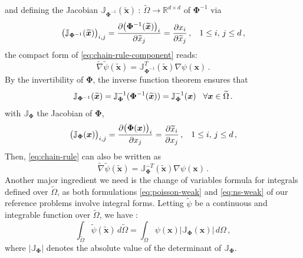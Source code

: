 \documentclass[12pt, a4paper, twoside, openright, notitlepage]{report}
\numberwithin{equation}{chapter}
\theoremstyle{theorem}
\theoremstyle{definition}
\theoremstyle{remark}
\theoremstyle{proposition}
\numberwithin{figure}{chapter}
\newcommand{\wt}[1]{\widetilde{#1}}
\newcommand{\bg}[1]{\boldsymbol{#1}}
\begin{document}
		and defining the Jacobian $\mathbb{J}_{\bg{\Phi}^{-1}}(\wt{\bg{x}}) ~ : ~ \wt{\Omega} \rightarrow \mathbb{R}^{d \times d}$ of $\bg{\Phi}^{-1}$ via
		\begin{equation*}
			\big( \mathbb{J}_{\bg{\Phi}^{-1}}(\wt{\bg{x}}) \big)_{i,j} = \dfrac{\partial \big( \bg{\Phi}^{-1}(\wt{\bg{x}}) \big)_i}{\partial \wt{x}_j} = \dfrac{\partial x_i}{\partial \wt{x}_j} \, , \hspace*{0.3cm} 1 \leq i, \, j \leq d \, ,
		\end{equation*} 
		the compact form of \eqref{eq:chain-rule-component} reads:
		\begin{equation}
			\label{eq:chain-rule}
			\wt{\nabla}{\wt{\psi}}(\wt{\bg{x}}) = \mathbb{J}_{\bg{\Phi}^{-1}}^T (\wt{\bg{x}}) \nabla{\psi}(\bg{x}) \, .
		\end{equation}  
		By the invertibility of $\bg{\Phi}$, the inverse function theorem \cite{Rud64} ensures that
		\begin{equation*}
			\mathbb{J}_{\bg{\Phi}^{-1}} (\wt{\bg{x}}) = \mathbb{J}^{-1}_{\bg{\Phi}} (\bg{\Phi}^{-1}(\wt{\bg{x}})) = \mathbb{J}^{-1}_{\bg{\Phi}} (\bg{x}) \hspace*{0.3cm} \forall \bg{x} \in \wt{\Omega} \, .
		\end{equation*}
		with $\mathbb{J}_{\bg{\Phi}}$ the Jacobian of $\bg{\Phi}$,
		\begin{equation*}
			\big( \mathbb{J}_{\bg{\Phi}}(\bg{x}) \big)_{i,j} = \dfrac{\partial \big( \bg{\Phi}(\bg{x}) \big)_i}{\partial x_j} = \dfrac{\partial \wt{x}_i}{\partial x_j} \, , \hspace*{0.3cm} 1 \leq i, \, j \leq d \, ,
		\end{equation*}
		Then, \eqref{eq:chain-rule} can also be written as
		\begin{equation}
			\label{eq:chain-rule-bis}
			\wt{\nabla}{\wt{\psi}}(\wt{\bg{x}}) = \mathbb{J}_{\bg{\Phi}}^{-T} (\wt{\bg{x}}) \nabla{\psi}(\bg{x}) \, .
		\end{equation}  
		Another major ingredient we need is the change of variables formula for integrals defined over $\wt{\Omega}$, as both formulations \eqref{eq:poisson-weak} and \eqref{eq:ns-weak} of our reference problems involve integral forms. Letting $\wt{\psi}$ be a continuous and integrable function over $\wt{\Omega}$, we have \cite{Rud64}:
		\begin{equation}
			\label{eq:change-of-variables}
			\int_{\wt{\Omega}} \wt{\psi}(\wt{\bg{x}}) \, d \wt{\Omega} = \int_{\Omega} \psi(\bg{x}) \lvert \mathbb{J}_{\bg{\Phi}}(\bg{x}) \rvert \, d \Omega \, ,
		\end{equation}
		where $\lvert \mathbb{J}_{\bg{\Phi}} \rvert$ denotes the absolute value of the determinant of $\mathbb{J}_{\bg{\Phi}}$.
		
\end{document}
